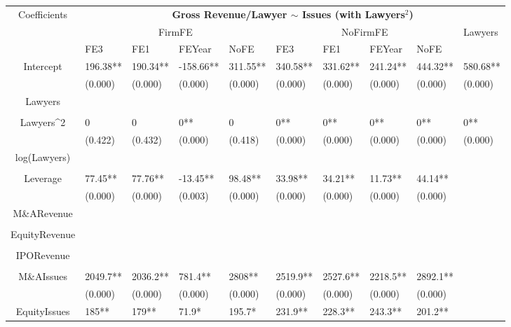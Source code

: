 \documentclass{article}
\begin{document}
\begin{table}[H]
\centering
\begin{tabular}{|clllllllll|}
\hline
\multirow{3}{*}{Coefficients} & \multicolumn{9}{c|}{\textbf{Gross Revenue/Lawyer $\sim$ Issues (with Lawyers$^2$)}} \\
\cline{2-10}
& \multicolumn{4}{c}{FirmFE} & \multicolumn{4}{c}{NoFirmFE} & \multirow{2}{*}{Lawyers} \\
\cline{2-9}
& FE3 & FE1 & FEYear & NoFE & FE3 & FE1 & FEYear & NoFE &  \\
\hline
 
Intercept & 196.38** & 190.34** & -158.66** & 311.55** & 340.58** & 331.62** & 241.24** & 444.32** & 580.68** \\ 
   & (0.000) & (0.000) & (0.000) & (0.000) & (0.000) & (0.000) & (0.000) & (0.000) & (0.000) \\ 
  Lawyers &  &  &  &  &  &  &  &  &  \\ 
   &  &  &  &  &  &  &  &  &  \\ 
  Lawyers^2 & 0 & 0 & 0** & 0 & 0** & 0** & 0** & 0** & 0** \\ 
   & (0.422) & (0.432) & (0.000) & (0.418) & (0.000) & (0.000) & (0.000) & (0.000) & (0.000) \\ 
  log(Lawyers) &  &  &  &  &  &  &  &  &  \\ 
   &  &  &  &  &  &  &  &  &  \\ 
  Leverage & 77.45** & 77.76** & -13.45** & 98.48** & 33.98** & 34.21** & 11.73** & 44.14** &  \\ 
   & (0.000) & (0.000) & (0.003) & (0.000) & (0.000) & (0.000) & (0.000) & (0.000) &  \\ 
  M\&ARevenue &  &  &  &  &  &  &  &  &  \\ 
   &  &  &  &  &  &  &  &  &  \\ 
  EquityRevenue &  &  &  &  &  &  &  &  &  \\ 
   &  &  &  &  &  &  &  &  &  \\ 
  IPORevenue &  &  &  &  &  &  &  &  &  \\ 
   &  &  &  &  &  &  &  &  &  \\ 
  M\&AIssues & 2049.7** & 2036.2** & 781.4** & 2808** & 2519.9** & 2527.6** & 2218.5** & 2892.1** &  \\ 
   & (0.000) & (0.000) & (0.000) & (0.000) & (0.000) & (0.000) & (0.000) & (0.000) &  \\ 
  EquityIssues & 185** & 179** & 71.9* & 195.7* & 231.9** & 228.3** & 243.3** & 201.2** &  \\ 

\end{tabular}
\end{table}
\end{document}
